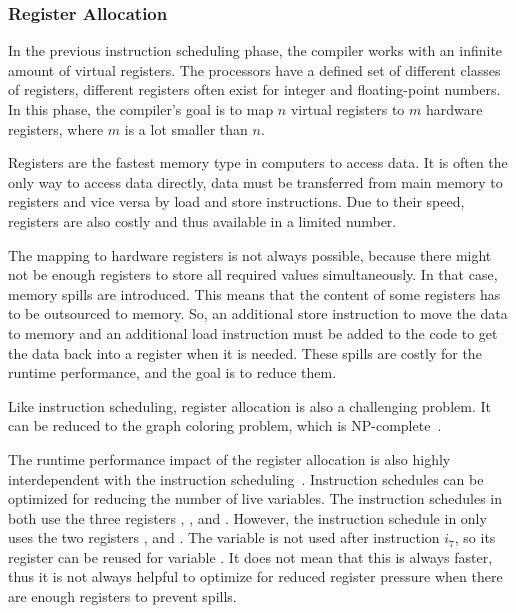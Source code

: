 \subsubsection{Register Allocation}
In the previous instruction scheduling phase, the compiler works with an infinite amount of virtual registers.
The processors have a defined set of different classes of registers, \eg different registers often exist for integer and floating-point numbers.
In this phase, the compiler's goal is to map $n$ virtual registers to $m$ hardware registers, where $m$ is a lot smaller than $n$.

Registers are the fastest memory type in computers to access data.
It is often the only way to access data directly, \ie data must be transferred from main memory to registers and vice versa by load and store instructions.
Due to their speed, registers are also costly and thus available in a limited number.

The mapping to hardware registers is not always possible, because there might not be enough registers to store all required values simultaneously.
In that case, memory spills are introduced.
This means that the content of some registers has to be outsourced to memory.
So, an additional store instruction to move the data to memory and an additional load instruction must be added to the code to get the data back into a register when it is needed.
These spills are costly for the runtime performance, and the goal is to reduce them.

Like instruction scheduling, register allocation is also a challenging problem.
It can be reduced to the graph coloring problem, which is NP-complete~\cite{lavrov1962store}.

The runtime performance impact of the register allocation is also highly interdependent with the instruction scheduling~\cite{goodman1988code}.
Instruction schedules can be optimized for reducing the number of live variables.
The instruction schedules in  both use the three registers , , and .
However, the instruction schedule in  only uses the two registers , and .
The variable  is not used after instruction $i_7$, so its register  can be reused for variable .
It does not mean that this is always faster, \eg thus it is not always helpful to optimize for reduced register pressure when there are enough registers to prevent spills.

